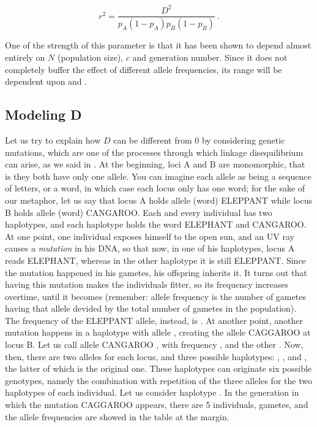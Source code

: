 \documentclass[../main.tex]{subfiles}
\begin{document}
\begin{equation}
\label{eq:squaredcorrelationcoeff}
r^2 = \frac{D^2}{p_A (1 - p_A) p_B (1 - p_B)}\ .
\end{equation}

One of the strength of this parameter is that it has been shown to 
depend almost entirely on \(N\) (population size), \(c\) and generation 
number. Since it does not completely buffer the effect of different 
allele frequencies, its range will be dependent upon  and 
.



\subsection{Modeling D}

Let us try to explain how \(D\) can be different from \(0\) by 
considering genetic mutations, which are one of the processes through 
which linkage disequilibrium can arise, as we said in 
. At the beginning, loci A and B are monomorphic, 
that is they both have only one allele. You can imagine each allele as 
being a sequence of letters, or a word, in which case each locus only 
has one word; for the sake of our metaphor, let us say that locus A 
holds allele (word) ELEPPANT while locus B holds allele (word) CANGAROO. 
Each and every individual has two haplotypes, and each haplotype holds 
the word ELEPHANT and CANGAROO. At one point, one individual exposes 
himself to the open sun, and an UV ray causes a \textit{mutation} in his 
DNA, so that now, in one of his haplotypes, locus A reads ELEPHANT, 
whereas in the other haplotype it is still ELEPPANT. Since the mutation 
happened in his gametes, his offspring inherits it. It turns out that 
having this mutation makes the individuals fitter, so its frequency 
increases overtime, until it becomes  (remember: allele 
frequency is the number of gametes having that allele devided by the 
total number of gametes in the population). The frequency of the 
ELEPPANT allele, instead, is . At another point, another 
mutation happens in a haplotype with allele , creating the 
allele CAGGAROO at locus B. Let us call allele CANGAROO , with 
frequency , and the other . Now, then, there are two 
alleles for each locus, and three possible haplotypes: , 
, and , the latter of which is the original one. These 
haplotypes can originate six possible genotypes, namely the combination 
with repetition of the three alleles for the two haplotypes of each 
individual. Let us consider haplotype . In the generation in 
which the mutation CAGGAROO appears, there are 5 individuals,  
gametes, and the allele frequencies are showed in the table at the 
margin.
\end{document}
